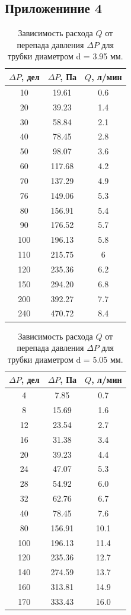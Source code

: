 \subsection{Приложениние 4} \label{Приложение 4}
\begin{table}[ht]
\begin{tabular}{|c|c|c|}
\hline
{$\Delta P$, дел} & {$\Delta P$, Па} & {$Q$, л/мин} \\
\hline
10 & 19.61 & 0.6 \\ \hline
20 & 39.23 & 1.4 \\ \hline
30 & 58.84 & 2.1 \\ \hline
40 & 78.45 & 2.8 \\ \hline
50 & 98.07 & 3.6 \\ \hline
60 & 117.68 & 4.2 \\ \hline
70 & 137.29 & 4.9 \\ \hline
76 & 149.06 & 5.3 \\ \hline
80 & 156.91 & 5.4 \\ \hline
90 & 176.52 & 5.7 \\ \hline
100 & 196.13 & 5.8 \\ \hline
110 & 215.75 & 6 \\ \hline
120 & 235.36 & 6.2 \\ \hline
150 & 294.20 & 6.8 \\ \hline
200 & 392.27 & 7.7 \\ \hline
240 & 470.72 & 8.4 \\ \hline
\end{tabular}
\caption{
\centering Зависимость расхода $Q$ от перепада давления $\Delta P$ для трубки диаметром d = 3.95 мм.}
\end{table}

\begin{table}[ht]
\begin{tabular}{|c|c|c|}
 \hline
{$\Delta P$, дел} & {$\Delta P$, Па} & {$Q$, л/мин} \\
 \hline
4 & 7.85 & 0.7 \\  \hline
8 & 15.69 & 1.6 \\ \hline
12 & 23.54 & 2.7 \\ \hline
16 & 31.38 & 3.4 \\ \hline
20 & 39.23 & 4.4 \\ \hline
24 & 47.07 & 5.3 \\ \hline
28 & 54.92 & 6.0 \\ \hline
32 & 62.76 & 6.7 \\ \hline
40 & 78.45 & 7.6 \\ \hline
80 & 156.91 & 10.1 \\ \hline
100 & 196.13 & 11.4 \\ \hline
120 & 235.36 & 12.7 \\ \hline
140 & 274.59 & 13.7 \\ \hline
160 & 313.81 & 14.9 \\ \hline
170 & 333.43 & 16.0 \\ \hline
\end{tabular}
\caption{
\centering Зависимость расхода $Q$ от перепада давления $\Delta P$ для трубки диаметром d = 5.05 мм.}
\end{table}
\newpage
